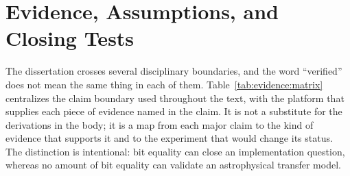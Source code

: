\chapter{Evidence, Assumptions, and Closing Tests}
\label{app:evidence}

The dissertation crosses several disciplinary boundaries, and the word
``verified'' does not mean the same thing in each of them.  Table~\ref{tab:evidence:matrix}
centralizes the claim boundary used throughout the text, with the platform that supplies each piece of evidence named in the claim.  It is not a
substitute for the derivations in the body; it is a map from each major claim to
the kind of evidence that supports it and to the experiment that would change
its status.  The distinction is intentional: bit equality can close an
implementation question, whereas no amount of bit equality can validate an
astrophysical transfer model.

